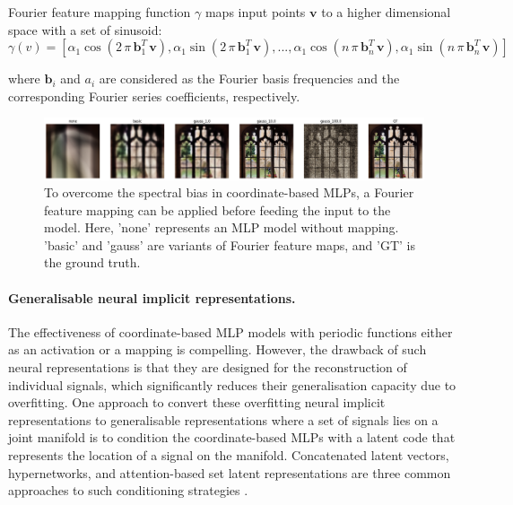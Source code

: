 Fourier feature mapping function $\gamma$ maps input points $\mathbf{v}$ to a higher dimensional space with a set of sinusoid:
\begin{equation}
\gamma(v) = [\alpha_1 \cos(2 \, \pi \, \mathbf{b}^T_1 \, \mathbf{v}), \alpha_1 \sin(2 \, \pi \, \mathbf{b}^T_1 \, \mathbf{v}), ..., \alpha_1 \cos(n \, \pi \, \mathbf{b}^T_n \, \mathbf{v}), \alpha_1 \sin(n \, \pi \, \mathbf{b}^T_n \, \mathbf{v})]
\label{eq:ffn}
\end{equation}

where $\mathbf{b}_i$ and $a_i$ are considered as  the Fourier basis frequencies and the corresponding Fourier series coefficients, respectively.

\begin{figure}[ht]
  \centering
   \includegraphics[width=\linewidth]{Images/FFN.png}
   \caption{To overcome the spectral bias in coordinate-based MLPs, a Fourier feature mapping \cite{ffn} can be applied before feeding the input to the model. Here, 'none' represents an MLP model without mapping. 'basic' and 'gauss' are variants of Fourier feature maps, and 'GT' is the ground truth.}
   \label{fig:ffn}
\end{figure}

\paragraph{Generalisable neural implicit representations.}
The effectiveness of coordinate-based \gls{MLP} models with periodic functions either as an activation or a mapping is compelling. However, the drawback of such neural representations is that they are designed for the reconstruction of individual signals, which significantly reduces their generalisation capacity due to overfitting. One approach to convert these overfitting neural implicit representations to generalisable representations where a set of signals lies on a joint manifold is to condition the coordinate-based \gls{MLP}s with a latent code that represents the location of a signal on the manifold. Concatenated latent vectors, hypernetworks, and attention-based set latent representations are three common approaches to such conditioning strategies \cite{rebain2022attention}.

